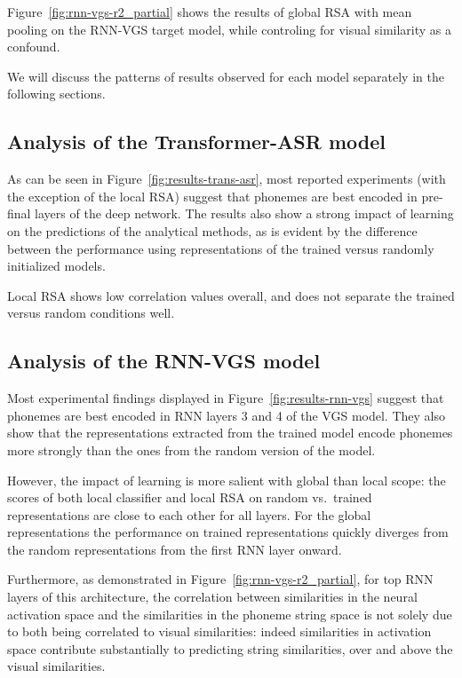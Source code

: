 Figure~\ref{fig:rnn-vgs-r2_partial} shows the results of global RSA
with mean pooling on the RNN-VGS target model, while
controling for visual similarity as a confound. 


We will discuss the patterns of results observed for each model separately in the following sections.

\subsection{Analysis of the Transformer-ASR model}
\label{sec:results-trans-asr}

As can be seen in Figure~\ref{fig:results-trans-asr}, most reported experiments (with the exception of 
the local RSA) suggest that phonemes are best encoded in pre-final layers of the deep network. 
The results also show a strong impact of learning on the predictions of the analytical methods, 
as is evident by the difference between the performance using representations of the trained 
versus randomly initialized models. 

Local RSA shows low correlation values overall, and does not separate the trained versus random conditions well. 

\subsection{Analysis of the RNN-VGS model}
\label{sec:results-rnn-vgs}

Most experimental findings displayed in
Figure~\ref{fig:results-rnn-vgs} suggest that phonemes are best
encoded in RNN layers 3 and 4 of the VGS model.
They also show that the representations extracted from the trained model encode
phonemes more strongly than the ones from the random version of the
model.

However, the impact of learning is more salient with 
global than local scope: the scores of both local classifier and local 
RSA on random vs.\ trained representations are close to each other for all layers. For the 
global representations the performance on trained representations quickly diverges 
from the random representations from the first RNN layer onward.

Furthermore, as demonstrated in Figure~\ref{fig:rnn-vgs-r2_partial},
for top RNN layers of this architecture, the correlation between
similarities in the neural activation space and the similarities in
the phoneme string space is not solely due to both being correlated to
visual similarities: indeed similarities in activation space contribute
substantially to predicting string similarities, over and above the
visual similarities.

